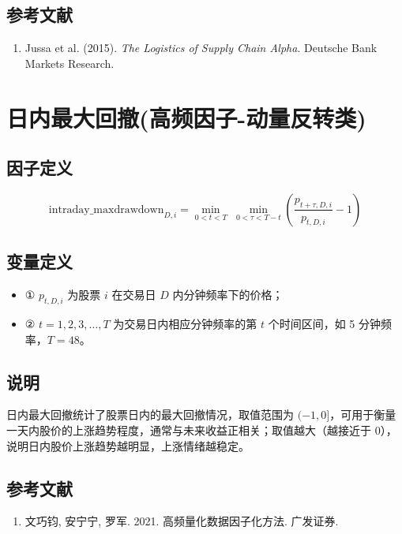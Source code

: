 \documentclass{article}
\begin{document}
\subsection{参考文献}
\begin{enumerate}
    \item Jussa et al. (2015). \textit{The Logistics of Supply Chain Alpha}. Deutsche Bank Markets Research.
\end{enumerate}

\section{日内最大回撤(高频因子-动量反转类)}

\subsection{因子定义}
\begin{equation}
    \mathrm{intraday\_maxdrawdown}_{D,i} = \min_{0 < t < T} \; \min_{0 < \tau < T - t} \left( \frac{p_{t+\tau,D,i}}{p_{t,D,i}} - 1 \right)
\end{equation}

\subsection{变量定义}
\begin{itemize}
    \item ① \( p_{t,D,i} \) 为股票 \( i \) 在交易日 \( D \) 内分钟频率下的价格；
    \item ② \( t = 1,2,3,\ldots,T \) 为交易日内相应分钟频率的第 \( t \) 个时间区间，如 5 分钟频率，\( T=48 \)。
\end{itemize}

\subsection{说明}
日内最大回撤统计了股票日内的最大回撤情况，取值范围为 \((-1,0]\)，可用于衡量一天内股价的上涨趋势程度，通常与未来收益正相关；取值越大（越接近于 0），说明日内股价上涨趋势越明显，上涨情绪越稳定。

\subsection{参考文献}
\begin{enumerate}
    \item 文巧钧, 安宁宁, 罗军. 2021. 高频量化数据因子化方法. 广发证券.
\end{enumerate}
\end{document}
